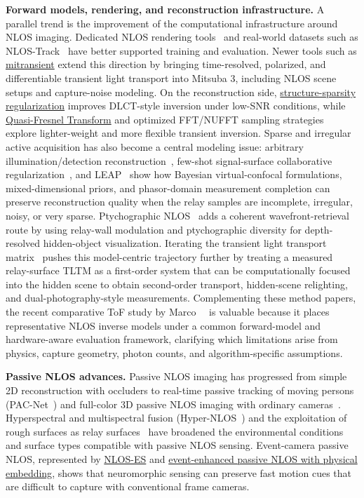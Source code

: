\textbf{Forward models, rendering, and reconstruction infrastructure.}
A parallel trend is the improvement of the computational infrastructure around NLOS imaging. Dedicated NLOS rendering tools~\cite{royoNLOSTransientRendering2022,plackFastDifferentiable2023} and real-world datasets such as NLOS-Track~\cite{wangPropagateCalibrate2023} have better supported training and evaluation. Newer tools such as \href{https://arxiv.org/abs/2510.25660}{mitransient} extend this direction by bringing time-resolved, polarized, and differentiable transient light transport into Mitsuba 3, including NLOS scene setups and capture-noise modeling. On the reconstruction side, \href{https://arxiv.org/abs/2308.02782}{structure-sparsity regularization} improves DLCT-style inversion under low-SNR conditions, while \href{https://arxiv.org/abs/2508.02003}{Quasi-Fresnel Transform} and optimized FFT/NUFFT sampling strategies~\cite{sultanOptimizedSamplingNLOS2025} explore lighter-weight and more flexible transient inversion. Sparse and irregular active acquisition has also become a central modeling issue: arbitrary illumination/detection reconstruction~\cite{liuArbitraryPatternNLOS2023}, few-shot signal-surface collaborative regularization~\cite{liuFewShotSSCR2022}, and LEAP~\cite{choLEAP2024} show how Bayesian virtual-confocal formulations, mixed-dimensional priors, and phasor-domain measurement completion can preserve reconstruction quality when the relay samples are incomplete, irregular, noisy, or very sparse. Ptychographic NLOS~\cite{songPtychographicNLOS2024} adds a coherent wavefront-retrieval route by using relay-wall modulation and ptychographic diversity for depth-resolved hidden-object visualization. Iterating the transient light transport matrix~\cite{sultanIteratingTLTM2026} pushes this model-centric trajectory further by treating a measured relay-surface TLTM as a first-order system that can be computationally focused into the hidden scene to obtain second-order transport, hidden-scene relighting, and dual-photography-style measurements. Complementing these method papers, the recent comparative ToF study by Marco~\etal~\cite{marcoComprehensiveToFNLOS2026} is valuable because it places representative NLOS inverse models under a common forward-model and hardware-aware evaluation framework, clarifying which limitations arise from physics, capture geometry, photon counts, and algorithm-specific assumptions.

\textbf{Passive NLOS advances.}
Passive NLOS imaging has progressed from simple 2D reconstruction with occluders to real-time passive tracking of moving persons (PAC-Net~\cite{wangPropagateCalibrate2023}) and full-color 3D passive NLOS imaging with ordinary cameras~\cite{czajkowskiTwoEdge2024}. Hyperspectral and multispectral fusion (Hyper-NLOS~\cite{chenHyperNLOS2024}) and the exploitation of rough surfaces as relay surfaces~\cite{liRoughSurfaces2025} have broadened the environmental conditions and surface types compatible with passive NLOS sensing. Event-camera passive NLOS, represented by \href{https://arxiv.org/abs/2209.13300}{NLOS-ES} and \href{https://arxiv.org/abs/2404.05977}{event-enhanced passive NLOS with physical embedding}, shows that neuromorphic sensing can preserve fast motion cues that are difficult to capture with conventional frame cameras.

